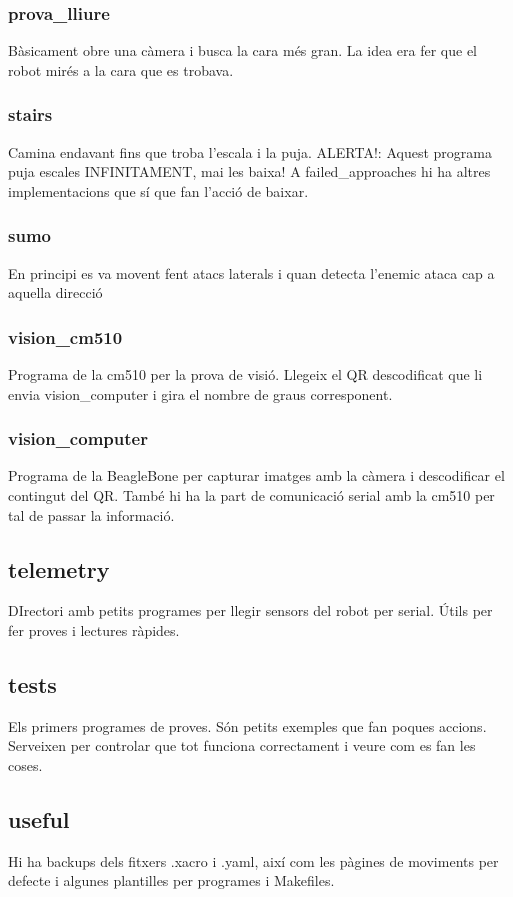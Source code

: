 \documentclass{article}
\begin{document}
\subsubsection{prova\_lliure}
Bàsicament obre una càmera i busca la cara més gran. La idea era fer que el robot mirés a la cara que es trobava.
\subsubsection{stairs}
Camina endavant fins que troba l'escala i la puja. ALERTA!: Aquest programa puja escales INFINITAMENT, mai les baixa! A failed\_approaches hi ha altres implementacions que sí que fan l'acció de baixar.
\subsubsection{sumo}
En principi es va movent fent atacs laterals i quan detecta l'enemic ataca cap a aquella direcció
\subsubsection{vision\_cm510}
Programa de la cm510 per la prova de visió. Llegeix el QR descodificat que li envia vision\_computer i gira el nombre de graus corresponent.
\subsubsection{vision\_computer}
Programa de la BeagleBone per capturar imatges amb la càmera i descodificar el contingut del QR. També hi ha la part de comunicació serial amb la cm510 per tal de passar la informació.

\subsection{telemetry}
DIrectori amb petits programes per llegir sensors del robot per serial. Útils per fer proves i lectures ràpides.
\subsection{tests}
Els primers programes de proves. Són petits exemples que fan poques accions. Serveixen per controlar que tot funciona correctament i veure com es fan les coses.
\subsection{useful}
Hi ha backups dels fitxers .xacro i .yaml, així com les pàgines de moviments per defecte i algunes plantilles per programes i Makefiles.
\end{document}
